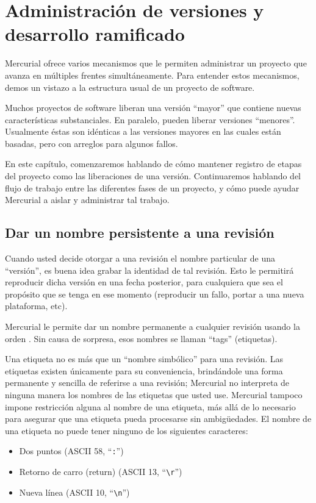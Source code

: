 \chapter{Administración de versiones y desarrollo ramificado}
\label{chap:branch}

Mercurial ofrece varios mecanismos que le permiten administrar un
proyecto que avanza en múltiples frentes simultáneamente. Para
entender estos mecanismos, demos un vistazo a la estructura usual de
un proyecto de software.

Muchos proyectos de software liberan una versión ``mayor'' que contiene
nuevas características substanciales.  En paralelo, pueden liberar
versiones ``menores''.   Usualmente éstas son idénticas a las
versiones mayores en las cuales están basadas, pero con arreglos para
algunos fallos.

En este capítulo, comenzaremos hablando de cómo mantener registro de
etapas del proyecto como las liberaciones de una
versión. Continuaremos hablando del flujo de trabajo entre las
diferentes fases de un proyecto, y cómo puede ayudar Mercurial a
aislar y administrar tal trabajo.

\section{Dar un nombre persistente a una revisión}

Cuando usted decide otorgar a una revisión el nombre particular de una
``versión'', es buena idea grabar la identidad de tal revisión.
Esto le permitirá reproducir dicha versión en una fecha posterior,
para cualquiera que sea el 
propósito que se tenga en ese momento (reproducir un fallo, portar
a una nueva plataforma, etc).

Mercurial le permite dar un nombre permanente a cualquier revisión
usando la orden .  Sin causa de sorpresa, esos nombres se llaman
``tags'' (etiquetas).

Una etiqueta no es más que un ``nombre simbólico'' para una revisión.  Las
etiquetas existen únicamente para su conveniencia, brindándole una forma
permanente y sencilla de referirse a una revisión; Mercurial no
interpreta de ninguna manera los nombres de las etiquetas que usted use.
Mercurial tampoco impone restricción alguna al nombre de una etiqueta, más
allá de lo necesario para asegurar que una etiqueta pueda procesarse sin
ambigüedades. El nombre de una etiqueta no puede tener ninguno de los
siguientes caracteres:
\begin{itemize}
\item Dos puntos (ASCII 58, ``\texttt{:}'')
\item Retorno de carro (return) (ASCII 13, ``\Verb+\r+'')
\item Nueva línea (ASCII 10, ``\Verb+\n+'')
\end{itemize}


